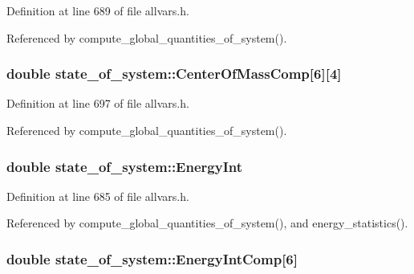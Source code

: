 Definition at line 689 of file allvars.h.



Referenced by compute\_\-global\_\-quantities\_\-of\_\-system().

\hypertarget{structstate__of__system_a828dd437a8be308919aa25633135a902}{
\subsubsection[{CenterOfMassComp}]{\setlength{\rightskip}{0pt plus 5cm}double {\bf state\_\-of\_\-system::CenterOfMassComp}\mbox{[}6\mbox{]}\mbox{[}4\mbox{]}}}
\label{structstate__of__system_a828dd437a8be308919aa25633135a902}


Definition at line 697 of file allvars.h.



Referenced by compute\_\-global\_\-quantities\_\-of\_\-system().

\hypertarget{structstate__of__system_a8ee567f49007a65817989a252d8c4f90}{
\subsubsection[{EnergyInt}]{\setlength{\rightskip}{0pt plus 5cm}double {\bf state\_\-of\_\-system::EnergyInt}}}
\label{structstate__of__system_a8ee567f49007a65817989a252d8c4f90}


Definition at line 685 of file allvars.h.



Referenced by compute\_\-global\_\-quantities\_\-of\_\-system(), and energy\_\-statistics().

\hypertarget{structstate__of__system_af96bea4b9655900eef6d7734629241a7}{
\subsubsection[{EnergyIntComp}]{\setlength{\rightskip}{0pt plus 5cm}double {\bf state\_\-of\_\-system::EnergyIntComp}\mbox{[}6\mbox{]}}}
\label{structstate__of__system_af96bea4b9655900eef6d7734629241a7}


